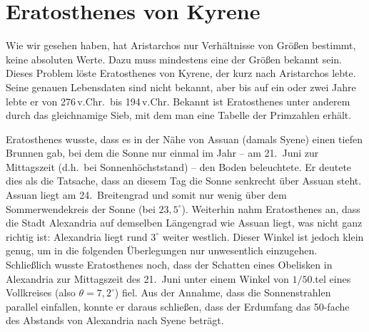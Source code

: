 \section{Eratosthenes von Kyrene}
\label{sec_Eratosthenes}

Wie wir gesehen haben, hat Aristarchos nur Verh\"altnisse von Gr\"o\ss en bestimmt, keine
absoluten Werte. Dazu muss mindestens eine der Gr\"o\ss en bekannt sein. 
Dieses
Problem l\"oste Eratosthenes von Kyrene, der kurz nach Aristarchos lebte. Seine genauen
Lebensdaten sind nicht bekannt, aber bis auf ein oder zwei Jahre lebte er von 276\,v.Chr.\ bis
194\,v.Chr. Bekannt ist Eratosthenes unter anderem durch das gleichnamige \glqq Sieb\grqq, mit dem man 
eine Tabelle der Primzahlen erh\"alt. 

Eratosthenes wusste, dass es in der N\"ahe von Assuan (damals Syene) einen tiefen Brunnen
gab, bei dem die Sonne nur einmal im Jahr -- am 21.\ Juni zur Mittagszeit 
(d.h.\ bei Sonnenh\"ochststand) -- den Boden beleuchtete. Er deutete dies 
als die Tatsache, dass an diesem Tag die Sonne senkrecht \"uber Assuan steht. Assuan liegt am
24.\ Breitengrad und somit nur wenig \"uber dem Sommerwendekreis der Sonne (bei $23,5^\circ$). 
Weiterhin nahm Eratosthenes an, dass die Stadt Alexandria auf demselben L\"angengrad wie
Assuan liegt, was nicht ganz richtig ist: Alexandria liegt rund $3^\circ$ weiter westlich. Dieser
Winkel ist jedoch klein genug, um in die
folgenden \"Uberlegungen nur unwesentlich einzugehen. 
Schlie\ss lich wusste Eratosthenes noch, dass der Schatten eines Obelisken in Alexandria zur
Mittagszeit des 21.\ Juni unter einem Winkel von $1/50$.tel eines Vollkreises (also $\theta=7,2^\circ$) fiel. 
Aus der Annahme, dass die Sonnenstrahlen parallel einfallen, konnte er daraus 
schlie\ss en, dass der Erdumfang das 50-fache des Abstands von Alexandria nach Syene 
betr\"agt. 

